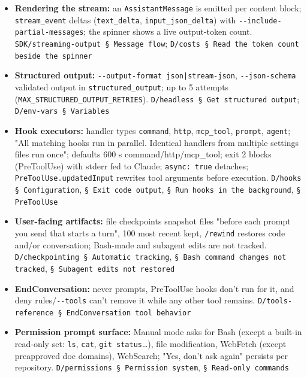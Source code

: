 \begin{itemize}
\item \textbf{Rendering the stream:} an \texttt{AssistantMessage} is emitted per content block; \texttt{stream\_\allowbreak{}event} deltas (\texttt{text\_\allowbreak{}delta}, \texttt{input\_\allowbreak{}json\_\allowbreak{}delta}) with \texttt{-\allowbreak{}-\allowbreak{}include-\allowbreak{}partial-\allowbreak{}messages}; the spinner shows a live output-token count. \texttt{SDK/\allowbreak{}streaming-\allowbreak{}output § Message flow}; \texttt{D/\allowbreak{}costs § Read the token count beside the spinner}
\item \textbf{Structured output:} \texttt{-\allowbreak{}-\allowbreak{}output-\allowbreak{}format json|stream-\allowbreak{}json}, \texttt{-\allowbreak{}-\allowbreak{}json-\allowbreak{}schema} validated output in \texttt{structured\_\allowbreak{}output}; up to 5 attempts (\texttt{MAX\_\allowbreak{}STRUCTURED\_\allowbreak{}OUTPUT\_\allowbreak{}RETRIES}). \texttt{D/\allowbreak{}headless § Get structured output}; \texttt{D/\allowbreak{}env-\allowbreak{}vars § Variables}
\item \textbf{Hook executors:} handler types \texttt{command}, \texttt{http}, \texttt{mcp\_\allowbreak{}tool}, \texttt{prompt}, \texttt{agent}; "All matching hooks run in parallel. Identical handlers from multiple settings files run once"; defaults 600 s command/http/mcp\_tool; exit 2 blocks (PreToolUse) with stderr fed to Claude; \texttt{async:\allowbreak{} true} detaches; \texttt{PreToolUse.\allowbreak{}updatedInput} rewrites tool arguments before execution. \texttt{D/\allowbreak{}hooks § Configuration}, \texttt{§ Exit code output}, \texttt{§ Run hooks in the background}, \texttt{§ PreToolUse}
\item \textbf{User-facing artifacts:} file checkpoints snapshot files "before each prompt you send that starts a turn", 100 most recent kept, \texttt{/\allowbreak{}rewind} restores code and/or conversation; Bash-made and subagent edits are not tracked. \texttt{D/\allowbreak{}checkpointing § Automatic tracking}, \texttt{§ Bash command changes not tracked}, \texttt{§ Subagent edits not restored}
\item \textbf{EndConversation:} never prompts, PreToolUse hooks don't run for it, and deny rules/\texttt{-\allowbreak{}-\allowbreak{}tools} can't remove it while any other tool remains. \texttt{D/\allowbreak{}tools-\allowbreak{}reference § EndConversation tool behavior}
\item \textbf{Permission prompt surface:} Manual mode asks for Bash (except a built-in read-only set: \texttt{ls}, \texttt{cat}, \texttt{git status}\ldots{}), file modification, WebFetch (except preapproved doc domains), WebSearch; "Yes, don't ask again" persists per repository. \texttt{D/\allowbreak{}permissions § Permission system}, \texttt{§ Read-\allowbreak{}only commands}
\end{itemize}


